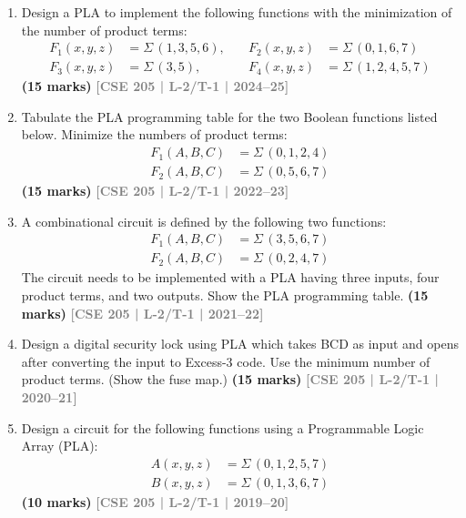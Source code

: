 \documentclass[12pt]{article}
\newcommand{\yr}[1]{\hfill\textcolor{gray}{\small\textbf{[#1]}}}
\newcommand{\mk}[1]{\textcolor{orange!70!black}{\small\textbf{(#1 marks)}}}
\begin{document}
\begin{enumerate}

\item Design a PLA to implement the following functions with the minimization of the number of product terms:
\begin{align*}
  F_1(x, y, z) &= \Sigma\,(1,3,5,6),\quad & F_2(x, y, z) &= \Sigma\,(0,1,6,7) \\
  F_3(x, y, z) &= \Sigma\,(3,5),\quad & F_4(x, y, z) &= \Sigma\,(1,2,4,5,7)
\end{align*}
\mk{15} \yr{CSE 205 | L-2/T-1 | 2024--25}



\item Tabulate the PLA programming table for the two Boolean functions listed below. Minimize the numbers of product terms:
\begin{align*}
  F_1(A, B, C) &= \Sigma\,(0, 1, 2, 4) \\
  F_2(A, B, C) &= \Sigma\,(0, 5, 6, 7)
\end{align*}
\mk{15} \yr{CSE 205 | L-2/T-1 | 2022--23}



\item A combinational circuit is defined by the following two functions:
\begin{align*}
  F_1(A, B, C) &= \Sigma\,(3, 5, 6, 7) \\
  F_2(A, B, C) &= \Sigma\,(0, 2, 4, 7)
\end{align*}
The circuit needs to be implemented with a PLA having three inputs, four product terms, and two outputs. Show the PLA programming table.
\mk{15} \yr{CSE 205 | L-2/T-1 | 2021--22}



\item Design a digital security lock using PLA which takes BCD as input and opens after converting the input to Excess-3 code. Use the minimum number of product terms. (Show the fuse map.)
\mk{15} \yr{CSE 205 | L-2/T-1 | 2020--21}



\item Design a circuit for the following functions using a Programmable Logic Array (PLA):
\begin{align*}
  A(x,y,z) &= \Sigma\,(0,1,2,5,7) \\
  B(x,y,z) &= \Sigma\,(0,1,3,6,7)
\end{align*}
\mk{10} \yr{CSE 205 | L-2/T-1 | 2019--20}




\end{enumerate}
\end{document}
